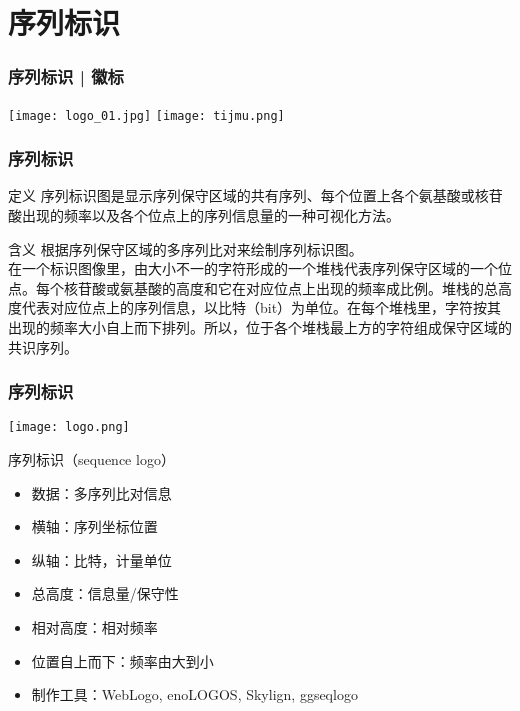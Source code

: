 \section{序列标识}
\begin{frame}
  \frametitle{序列标识 | 徽标}
  \begin{center}
    \texttt{[image: logo\_01.jpg]}
    \qquad
    \texttt{[image: tijmu.png]}
  \end{center}
\end{frame}

\begin{frame}
  \frametitle{\alert{序列标识}}
  \begin{block}{定义}
序列标识图是显示序列保守区域的共有序列、每个位置上各个氨基酸或核苷酸出现的频率以及各个位点上的序列信息量的一种可视化方法。
  \end{block}
  \pause
  \begin{block}{含义}
    根据序列保守区域的多序列比对来绘制序列标识图。\\
    \vspace{0.5em}
在一个标识图像里，由大小不一的字符形成的一个堆栈代表序列保守区域的一个位点。每个核苷酸或氨基酸的高度和它在对应位点上出现的频率成比例。堆栈的总高度代表对应位点上的序列信息，以比特（bit）为单位。在每个堆栈里，字符按其出现的频率大小自上而下排列。所以，位于各个堆栈最上方的字符组成保守区域的共识序列。
  \end{block}
\end{frame}

\begin{frame}
  \frametitle{\alert{序列标识}}
  \begin{center}
    \texttt{[image: logo.png]}
  \end{center}
  \pause
  \begin{block}{序列标识（sequence logo）}
    \begin{itemize}
      \item 数据：多序列比对信息
      \item 横轴：序列坐标位置
      \item 纵轴：比特，计量单位
      \item 总高度：信息量/保守性
      \item 相对高度：相对频率
      \item 位置自上而下：频率由大到小
      \item 制作工具：WebLogo, enoLOGOS, Skylign, ggseqlogo
    \end{itemize}
  \end{block}
\end{frame}

